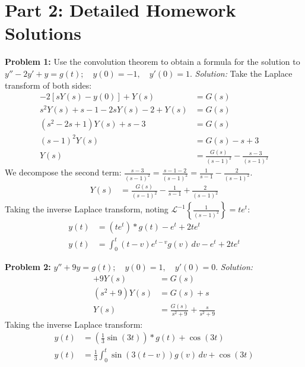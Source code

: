 \documentclass[11pt, letterpaper]{article}
\theoremstyle{definition}
\theoremstyle{remark}
\begin{document}
\newpage
\section{Part 2: Detailed Homework Solutions}

\textbf{Problem 1:} Use the convolution theorem to obtain a formula for the solution to $y'' - 2y' + y = g(t); \quad y(0) = -1, \quad y'(0) = 1$.
\textit{Solution:}
Take the Laplace transform of both sides:
\begin{align*}
[s^2Y(s) - sy(0) - y'(0)] - 2[sY(s) - y(0)] + Y(s) &= G(s) \\[4pt]
s^2Y(s) + s - 1 - 2sY(s) - 2 + Y(s) &= G(s) \\[4pt]
(s^2 - 2s + 1)Y(s) + s - 3 &= G(s) \\[4pt]
(s-1)^2Y(s) &= G(s) - s + 3 \\[4pt]
Y(s) &= \frac{G(s)}{(s-1)^2} - \frac{s-3}{(s-1)^2}
\end{align*}
We decompose the second term: $\frac{s-3}{(s-1)^2} = \frac{s-1-2}{(s-1)^2} = \frac{1}{s-1} - \frac{2}{(s-1)^2}$.
\begin{align*}
Y(s) &= \frac{G(s)}{(s-1)^2} - \frac{1}{s-1} + \frac{2}{(s-1)^2}
\end{align*}
Taking the inverse Laplace transform, noting $\mathscr{L}^{-1}\left\{\frac{1}{(s-1)^2}\right\} = t e^t$:
\begin{align*}
y(t) &= (t e^t) * g(t) - e^t + 2t e^t \\[4pt]
y(t) &= \int_0^t (t-v)e^{t-v}g(v) \, dv - e^t + 2t e^t
\end{align*}

\textbf{Problem 2:} $y'' + 9y = g(t); \quad y(0) = 1, \quad y'(0) = 0$.
\textit{Solution:}
\begin{align*}
[s^2Y(s) - s(1) - 0] + 9Y(s) &= G(s) \\[4pt]
(s^2 + 9)Y(s) &= G(s) + s \\[4pt]
Y(s) &= \frac{G(s)}{s^2+9} + \frac{s}{s^2+9}
\end{align*}
Taking the inverse Laplace transform:
\begin{align*}
y(t) &= \left(\frac{1}{3}\sin(3t)\right) * g(t) + \cos(3t) \\[4pt]
y(t) &= \frac{1}{3}\int_0^t \sin(3(t-v))g(v) \, dv + \cos(3t)
\end{align*}
\end{document}
